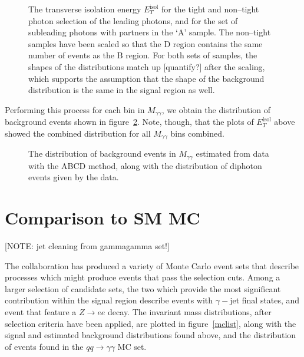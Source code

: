 \begin{figure}[htp]
\begin{minipage}[b]{.69\textwidth}
\begin{infilsf} \tiny 

\end{infilsf}
\end{minipage}\hfill\begin{minipage}[b]{.3\textwidth}
\caption{The transverse isolation energy $E_T^{\text{isol}}$ for the tight and non--tight photon selection of the leading photons, and for the set of subleading photons with partners in the `A' sample. The non--tight samples have been scaled so that the D region contains the same number of events as the B region. For both sets of samples, the shapes of the distributions match up [quantify?] after the scaling, which supports the assumption that the shape of the background distribution is the same in the signal region as well.
\label{etiso}}
\end{minipage}
\end{figure}

Performing this process for each bin in $M_{\gamma\gamma}$, we obtain the distribution of background events shown in figure~\ref{mggbck}. Note, though, that the plots of $E_T^{\text{isol}}$ above showed the combined distribution for all $M_{\gamma\gamma}$ bins combined.

\begin{figure}[htp]
\begin{minipage}[b]{.69\textwidth}
\begin{infilsf} \tiny 

\end{infilsf}
\end{minipage}\hfill\begin{minipage}[b]{.3\textwidth}
\caption{The distribution of background events in $M_{\gamma\gamma}$ estimated from data with the ABCD method, along with the distribution of diphoton events given by the data.
\label{mggbck}}
\end{minipage}
\end{figure}

\section{Comparison to SM MC}

[NOTE: jet cleaning from gammagamma set!]

The \atlas{} collaboration has produced a variety of Monte Carlo event sets that describe processes which might produce events that pass the selection cuts. Among a larger selection of candidate sets, the two which provide the most significant contribution within the signal region describe events with $\gamma-$jet final states, and event that feature a $Z\rightarrow ee$ decay. The invariant mass distributions, after selection criteria have been applied, are plotted in figure~\ref{mclist}, along with the signal and estimated background distributions found above, and the distribution of events found in the \atlas{} $qq\rightarrow\gamma\gamma$ MC set.

